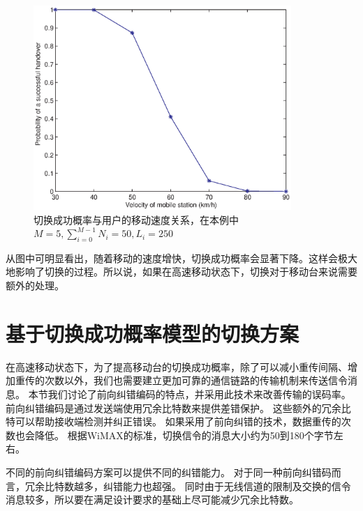\begin{figure}[t]
\begin{centering}
\includegraphics[height=7.75cm]{iccs_speed_prob_theroy}
\caption{切换成功概率与用户的移动速度关系，在本例中~$M=5, \sum_{i=0}^{M-1}N_i=50, L_i=250$~}
\label{fig:chap_iccs_handover_algorithm_Pro_V}
\end{centering}
\end{figure}

从图中可明显看出，随着移动的速度增快，切换成功概率会显著下降。这样会极大地影响了切换的过程。所以说，如果在高速移动状态下，切换对于移动台来说需要额外的处理。

\section{基于切换成功概率模型的切换方案}
在高速移动状态下，为了提高移动台的切换成功概率，除了可以减小重传间隔、增加重传的次数以外，我们也需要建立更加可靠的通信链路的传输机制来传送信令消息。
本节我们讨论了前向纠错编码的特点，并采用此技术来改善传输的误码率。
前向纠错编码是通过发送端使用冗余比特数来提供差错保护。
这些额外的冗余比特可以帮助接收端检测并纠正错误。
如果采用了前向纠错的技术，数据重传的次数也会降低。
根据WiMAX的标准，切换信令的消息大小约为50到180个字节左右。

不同的前向纠错编码方案可以提供不同的纠错能力。
对于同一种前向纠错码而言，冗余比特数越多，纠错能力也超强。
同时由于无线信道的限制及交换的信令消息较多，所以要在满足设计要求的基础上尽可能减少冗余比特数。

